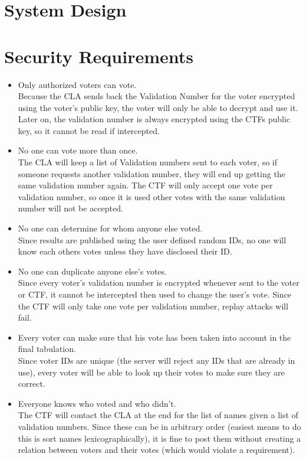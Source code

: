 \documentclass{article}
\begin{document}
\section{System Design}



\section{Security Requirements}

\begin{itemize}
  \item Only authorized voters can vote. \\
		Because the CLA sends back the Validation Number for the voter encrypted using the voter's public key, the voter will only be able to decrypt and use it. Later on, the validation number is always encrypted using the CTFs public key, so it cannot be read if intercepted.
	\item No one can vote more than once. \\
		The CLA will keep a list of Validation numbers sent to each voter, so if someone requests another validation number, they will end up getting the same validation number again. The CTF will only accept one vote per validation number, so once it is used other votes with the same validation number will not be accepted.
	\item No one can determine for whom anyone else voted. \\
		Since results are published using the user defined random IDs, no one will know each others votes unless they have disclosed their ID.
	\item No one can duplicate anyone else's votes. \\
		Since every voter's validation number is encrypted whenever sent to the voter or CTF, it cannot be intercepted then used to change the user's vote. Since the CTF will only take one vote per validation number, replay attacks will fail.	
	\item Every voter can make sure that his vote has been taken into account in the final tabulation. \\
		Since voter IDs are unique (the server will reject any IDs that are already in use), every voter will be able to look up their votes to make sure they are correct.
	\item Everyone knows who voted and who didn't. \\
		The CTF will contact the CLA at the end for the list of names given a list of validation numbers. Since these can be in arbitrary order (easiest means to do this is sort names lexicographically), it is fine to post them without creating a relation between voters and their votes (which would violate a requirement). 
\end{itemize}
\end{document}
